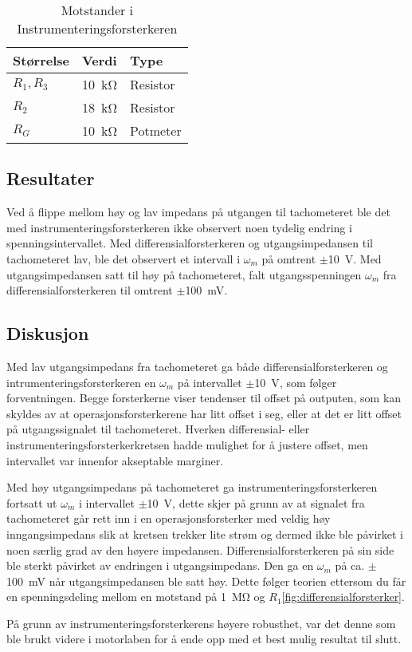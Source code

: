 \begin{table}[h]
	\centering
    \caption{Motstander i Instrumenteringsforsterkeren}
	\begin{tabular}{lll}
		\toprule
		Størrelse & Verdi & Type \\
		\midrule
        $R_1, R_3$ & \SI{10}{\kilo\ohm} & Resistor \\
        $R_2$ & \SI{18}{\kilo\ohm} & Resistor\\
        $R_G$ & \SI{10}{\kilo\ohm} & Potmeter\\
		\bottomrule
	\end{tabular}
    \label{tab:Instrumenteringsforsterker}
\end{table}







\subsection{Resultater}

Ved å flippe mellom høy og lav impedans på utgangen til tachometeret ble det med instrumenteringsforsterkeren ikke observert noen tydelig endring i spenningsintervallet. Med differensialforsterkeren og utgangsimpedansen til tachometeret lav, ble det observert et intervall i $\omega_m$ på omtrent $\pm${\SI{10}{\volt}}. Med utgangsimpedansen satt til høy på tachometeret, falt utgangsspenningen $\omega_m$ fra differensialforsterkeren til omtrent $\pm${\SI{100}{\milli\volt}}.






\subsection{Diskusjon}

Med lav utgangsimpedans fra tachometeret ga både differensialforsterkeren og intrumenteringsforsterkeren en $\omega_m$ på intervallet $\pm${\SI{10}{\volt}}, som følger forventningen. Begge forsterkerne viser tendenser til offset på outputen, som kan skyldes av at operasjonsforsterkerene har litt offset i seg, eller at det er litt offset på utgangssignalet til tachometeret. 
Hverken differensial- eller instrumenteringsforsterkerkretsen hadde mulighet for å justere offset, men intervallet var innenfor akseptable marginer.

Med høy utgangsimpedans på tachometeret ga instrumenteringsforsterkeren fortsatt ut $\omega_m$ i intervallet $\pm${\SI{10}{\volt}}, dette skjer på grunn av at signalet fra tachometeret går rett inn i en operasjonsforsterker med veldig høy inngangsimpedans slik at kretsen trekker lite strøm og dermed ikke ble påvirket i noen særlig grad av den høyere impedansen. 
Differensialforsterkeren på sin side ble sterkt påvirket av endringen i utgangsimpedans. Den ga en $\omega_m$ på ca. $\pm${\SI{100}{\milli\volt}} når utgangsimpedansen ble satt høy. Dette følger teorien ettersom du får en spenningsdeling mellom en motstand på {\SI{1}{\mega\ohm}} og $R_1$\autoref{fig:differensialforsterker}.

På grunn av instrumenteringsforsterkerens høyere robusthet, var det denne som ble brukt videre i motorlaben for å ende opp med et best mulig resultat til slutt.
